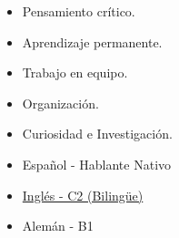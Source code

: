 \begin{itemize}
\item Pensamiento crítico.
\item Aprendizaje permanente.
\item Trabajo en equipo.
\item Organización.
\item Curiosidad e Investigación.
\end{itemize} 

\begin{itemize}
\item Español - Hablante Nativo \\
\item \href{https://cert.efset.org/en/cWjcVM}{Inglés - C2 (Bilingüe)}  \\
\item Alemán - B1
\end{itemize}


\vspace{70 mm}








